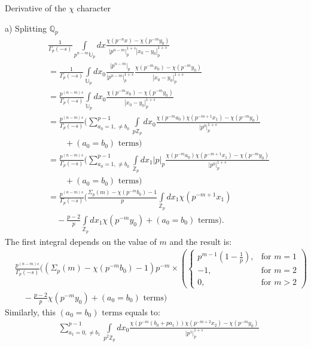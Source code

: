 \documentclass[12pt]{article}
\begin{document}
\begin{section}{Derivative of the $\chi$ character}
\begin{paragraph}{a) Splitting $\mathbb{Q}_p$}
\begin{equation}
\begin{aligned}
&\frac{1}{\Gamma_p(-s)} \int\limits _{p^{n-m} \mathbb{U}_p}dx \frac{\chi( p^{-n} x) - \chi( p^{-m}y_0)}{|p^{n-m}|_p^{1+s}|x_0-y_0|_p^{1+s}}\\
&=\frac{1}{\Gamma_p(-s)} \int\limits _{\mathbb{U}_p}dx_0 \frac{|p^{n-m}|_p}{|p^{n-m}|_p^{1+s}} \frac{\chi( p^{-m} x_0) - \chi( p^{-m}y_0)}{|x_0-y_0|_p^{1+s}}\\
&=\frac{p^{(n-m)s}}{\Gamma_p(-s)} \int\limits _{\mathbb{U}_p}dx_0 \frac{\chi( p^{-m} x_0) - \chi( p^{-m}y_0)}{|x_0-y_0|_p^{1+s}}\\
&=\frac{p^{(n-m)s}}{\Gamma_p(-s)} (\sum\limits_{a_0=1,\neq b_0}^{p-1}\int\limits _{p\mathbb{Z}_p}dx_0 \frac{\chi( p^{-m} a_0)\chi( p^{-m+1} x_1) - \chi( p^{-m}y_0)}{|p^0|_p^{1+s}}\\
&\qquad+(a_0=b_0)\text{ terms})\\
&=\frac{p^{(n-m)s}}{\Gamma_p(-s)} (\sum\limits_{a_0=1,\neq b_0}^{p-1}\int\limits _{\mathbb{Z}_p}dx_1|p|_p \frac{\chi( p^{-m} a_0)\chi( p^{-m+1} x_1) - \chi( p^{-m}y_0)}{|p^0|_p^{1+s}}\\
&\qquad+(a_0=b_0)\text{ terms})\\
&=\frac{p^{(n-m)s}}{\Gamma_p(-s)}(\frac{\Sigma_p(m)-\chi(p^{-m}b_0)-1}{p}\int\limits_{\mathbb{Z}_p}dx_1\chi(p^{-m+1}x_1)\\
&\quad-\frac{p-2}{p}\int\limits_{\mathbb{Z}_p}dx_1\chi(p^{-m}y_0)+(a_0=b_0)\text{ terms}).
\end{aligned}
\end{equation}
The first integral depends on the value of $m$ and the result is:
\begin{equation}
\begin{aligned}
&\frac{p^{(n-m)s}}{\Gamma_p(-s)}((\Sigma_p(m)-\chi(p^{-m}b_0)-1)p^{-m}\times\left( 
  \begin{cases}
    p^{m-1}(1-\frac{1}{p}), & \text{for } m=1 \\
    -1, & \text{for } m=2 \\
    0, & \text{for } m>2
  \end{cases}
   \right)\\
&\quad-\frac{p-2}{p}\chi(p^{-m}y_0)+(a_0=b_0)\text{ terms})
\end{aligned}
\end{equation}
Similarly, this $(a_0=b_0)\text{ terms}$ equals to:
\begin{equation}
\begin{aligned}
&\sum\limits_{a_1=0,\neq b_1}^{p-1}\int\limits _{p^2\mathbb{Z}_p}dx_0 \frac{\chi( p^{-m} (b_0+pa_1))\chi( p^{-m+2} x_2) - \chi( p^{-m}y_0)}{|p^1|_p^{1+s}}\\

\end{aligned}
\end{equation}
\end{paragraph}
\end{section}
\end{document}

